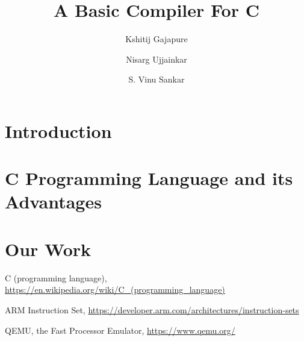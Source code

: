 \documentclass{clv3}
\title{A Basic Compiler For C}
\author{Kshitij Gajapure}
\affil{16110055}
\author{Nisarg Ujjainkar}
\affil{16110102}
\author{S. Vinu Sankar}
\affil{16110143}
\begin{document}
    \maketitle
    \section{Introduction}
    
    \section{C Programming Language and its Advantages}
    
    \section{Our Work}
    
    \begin{thebibliography}{9}
        C (programming language), \url{https://en.wikipedia.org/wiki/C_(programming_language)}

        ARM Instruction Set, \url{https://developer.arm.com/architectures/instruction-sets}

        QEMU, the Fast Processor Emulator, \url{https://www.qemu.org/}
    \end{thebibliography}
\end{document}
